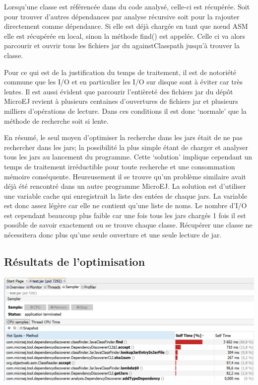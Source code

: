 \documentclass[french,a4paper,12pt]{report}
\begin{document}
Lorsqu’une classe est référencée dans du code analysé, celle-ci est récupérée. Soit pour trouver d’autres dépendances par analyse récursive soit pour la rajouter directement comme dépendance. Si elle est déjà chargée en tant que nœud ASM elle est récupérée en local, sinon la méthode find() est appelée. Celle ci va alors parcourir et ouvrir tous les fichiers jar du againstClasspath jusqu’à trouver la classe.

Pour ce qui est de la justification du temps de traitement, il est de notoriété commune que les I/O et en particulier les I/O sur disque sont à éviter car très lentes. Il est aussi évident que parcourir l’entièreté des fichiers jar du dépôt MicroEJ revient à plusieurs centaines d’ouvertures de fichiers jar et plusieurs milliers d’opérations de lecture. Dans ces conditions il est donc ‘normale’ que la méthode de recherche soit si lente.

En résumé, le seul moyen d’optimiser la recherche dans les jars était de ne pas rechercher dans les jars; la possibilité la plus simple étant de charger et analyser tous les jars au lancement du programme. Cette ‘solution’ implique cependant un temps de traitement irréductible pour toute recherche et une consommation mémoire conséquente. Heureusement il se trouve qu’un problème similaire avait déjà été rencontré dans un autre programme MicroEJ. La solution est d'utiliser une variable cache qui enregistrait la liste des entées de chaque jars. La variable est donc assez légère car elle ne contient qu’une liste de noms. Le nombre d’I/O est cependant beaucoup plus faible car une fois tous les jars chargés 1 fois il est possible de savoir exactement ou se trouve chaque classe. Récupérer une classe ne nécessitera donc plus qu’une seule ouverture et une seule lecture de jar.

\subsection{Résultats de l’optimisation}

\begin{center}
\includegraphics[width=\textwidth]{./ressources/images/timeRepartitionByMethodsCachedsheer.png}
\end{center}
\end{document}

